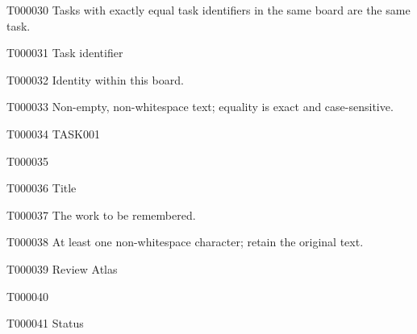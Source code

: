 \documentclass[11pt,a4paper]{article}
\begin{document}
\begin{atlasparagraph}{T000030}
Tasks with exactly equal task identifiers in the same board are the same task.
\end{atlasparagraph}
\begin{atlastext}{T000031}
Task identifier
\end{atlastext}
\begin{atlasparagraph}{T000032}
Identity within this board.
\end{atlasparagraph}
\begin{atlasparagraph}{T000033}
Non-empty, non-whitespace text; equality is exact and case-sensitive.
\end{atlasparagraph}
\begin{atlasitem}{T000034}
TASK001
\end{atlasitem}
\begin{atlasitem}{T000035}
   
\end{atlasitem}
\begin{atlastext}{T000036}
Title
\end{atlastext}
\begin{atlasparagraph}{T000037}
The work to be remembered.
\end{atlasparagraph}
\begin{atlasparagraph}{T000038}
At least one non-whitespace character; retain the original text.
\end{atlasparagraph}
\begin{atlasitem}{T000039}
Review Atlas
\end{atlasitem}
\begin{atlasitem}{T000040}

\end{atlasitem}
\begin{atlastext}{T000041}
Status
\end{atlastext}
\end{document}
